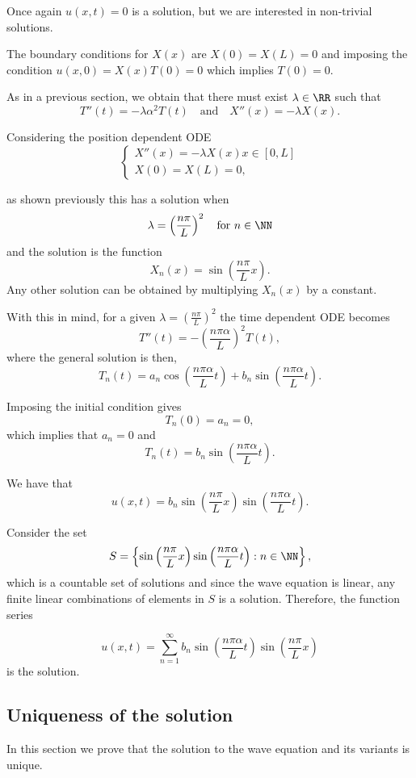 \documentclass[12pt, a4paper]{article}
\begin{document}
Once again \(u(x,t)=0\) is a solution, but we are interested in non-trivial solutions.

The boundary conditions for \(X(x)\) are \(X(0)=X(L)=0\) and imposing the condition \(u(x,0) = X(x)T(0)=0\) which implies \(T(0)=0\).

As in a previous section, we obtain that there must exist \(\lambda \in \RR\) such that 
\[T''(t)=-\lambda \alpha^2 T(t) \quad \text{and} \quad X''(x)=-\lambda X(x).\]

Considering the position dependent ODE 
\[\begin{cases}
    X''(x)=-\lambda X(x) x\in [0,L] \\
    X(0)=X(L)=0,
\end{cases}\]

as shown previously this has a solution when 
\[\lambda = \left( \frac{n\pi}{L} \right)^2 \quad \text{for } n \in \NN\]
and the solution is the function 
\[X_n(x)=\sin\left( \frac{n\pi}{L} x\right).\]
Any other solution can be obtained by multiplying \(X_n(x)\) by a constant.

With this in mind, for a given \(\lambda = \left( \frac{n\pi}{L} \right)^2\) the time dependent ODE becomes 
\[T''(t)=-\left( \frac{n\pi\alpha}{L} \right)^2 T(t),\]
where the general solution is then,
\[T_n(t)=a_n \cos \left( \frac{n\pi\alpha}{L} t\right)+b_n \sin \left( \frac{n\pi\alpha}{L}t \right).\]

Imposing the initial condition gives
\[T_n(0)=a_n=0,\]
which implies that \(a_n=0\) and 
\[T_n(t)=b_n \sin \left( \frac{n\pi\alpha}{L}t \right).\]

We have that 
\[u(x,t) =b_n \sin\left( \frac{n\pi}{L} x\right)\sin \left( \frac{n\pi\alpha}{L}t \right).\]

Consider the set 
\[S = \left\{ \sin\left( \frac{n\pi}{L} x\right)\sin \left( \frac{n\pi\alpha}{L}t \right): n \in \NN \right\},\]
which is a countable set of solutions and since the wave equation is linear, any finite linear combinations of elements in \(S\) is a solution. Therefore, the function series 

\[u(x,t) = \sum_{n=1}^{\infty} b_n \sin\left( \frac{n\pi \alpha}{L}t \right)\sin\left( \frac{n\pi}{L}x \right)\] 
is the solution.

\subsection{Uniqueness of the solution}

In this section we prove that the solution to the wave equation and its variants is unique.
\end{document}

